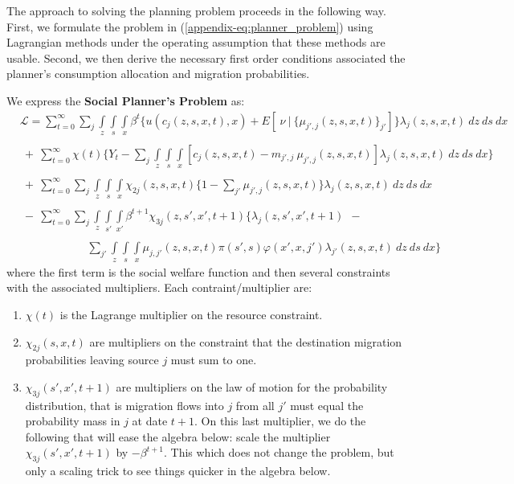 \documentclass[12pt,pdftex]{article}
\begin{document}
The approach to solving the planning problem proceeds in the following way. First, we formulate the problem in (\ref{appendix-eq:planner_problem}) using Lagrangian methods under the operating assumption that these methods are usable. Second, we then derive the necessary first order conditions associated the planner's consumption allocation and migration probabilities.

We express the \textbf{Social Planner's Problem} as:
{\small
\begin{align}
& \mathcal{L}  =   \sum_{t=0}^{\infty}\sum_{j} \int\limits_{z} \int\limits_{s} \int\limits_{x} \beta^{t} \bigg \{ u(c_{j}(z, s, x, t), x) + E[ \ \nu \ | \ \big\{\mu_{j',j}(z,s,x,t)\big\}_{j'}] \bigg \} \lambda_{j}(z, s, x, t) \ dz \ ds \ dx \label{appendix-eq:planner_L} \\
\nonumber \\
 & \ + \ \sum_{t=0}^{\infty} \chi(t) \bigg \{ Y_t - \sum_{j}\int\limits_{z} \int\limits_{s} \int\limits_{x} \left[ c_{j}(z, s, x, t)  -   m_{j',j} \ \mu_{j',j}(z, s, x, t)\right] \lambda_{j}(z, s, x, t) \ dz \ ds \ dx \bigg \} \nonumber \\
\nonumber  \\
& \ + \ \sum_{t=0}^{\infty} \sum_{j} \int\limits_{z} \int\limits_{s} \int\limits_{x} \chi_{2j}(z, s, x, t) \bigg \{1 - \sum_{j'} \mu_{j',j}(z, s, x,t) \bigg \} \lambda_{j}(z, s, x, t) \ dz \ ds \ dx \nonumber \\
\nonumber \\
& \ - \ \sum_{t=0}^{\infty} \sum_{j} \int\limits_{z} \int\limits_{s'} \int\limits_{x'} \beta^{t+1} \chi_{3j}(z, s', x', t+1) \bigg \{\lambda_{j}(z, s', x', t+1) \ \ - \nonumber \\
\nonumber \\
& \ \ \ \ \ \ \ \ \ \ \ \ \ \ \ \ \ \ \ \ \ \ \ \ \ \ \
 \sum_{j'} \int\limits_{z} \int\limits_{s} \int\limits_{x} \mu_{j,j'}(z,s,x,t) \pi(s',s) \varphi(x',x, j') \lambda_{j'}(z,s, x, t) \ dz \ ds  \ dx  \bigg \} \nonumber
\end{align}}where the first term is the social welfare function and then several constraints with the associated multipliers. Each contraint/multiplier are:
\begin{enumerate}
\item $\chi(t)$ is the Lagrange multiplier on the resource constraint.

\item $\chi_{2j}(s, x, t)$ are multipliers on the constraint that the destination migration probabilities leaving source $j$ must sum to one.

\item $\chi_{3j}(s', x', t+1)$ are multipliers on the law of motion for the probability distribution, that is migration flows into $j$ from all $j'$ must equal the probability mass in $j$ at date $t+1$. On this last multiplier, we do the following that will ease the algebra below: scale the multiplier $\chi_{3j}(s', x', t+1)$ by $-\beta^{t+1}$. This which does not change the problem, but only a scaling trick to see things quicker in the algebra below.
\end{enumerate}
\end{document}
